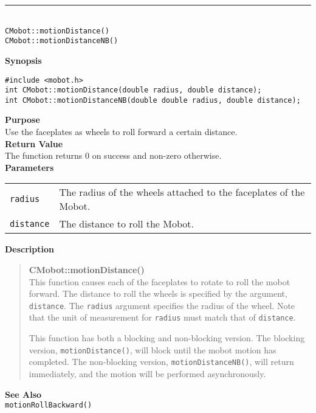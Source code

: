 \noindent
\vspace{5pt}
\rule{4.5in}{0.015in}\\
\noindent
{\LARGE \texttt{CMobot::motionDistance()}}\\
{\LARGE \texttt{CMobot::motionDistanceNB()}}\\
{}

\noindent
{\bf Synopsis}
\vspace{-8pt}
\begin{verbatim}
#include <mobot.h>
int CMobot::motionDistance(double radius, double distance);
int CMobot::motionDistanceNB(double double radius, double distance);
\end{verbatim}

\noindent
{\bf Purpose}\\
Use the faceplates as wheels to roll forward a certain distance.\\

\noindent
{\bf Return Value}\\
The function returns 0 on success and non-zero otherwise.\\

\noindent
{\bf Parameters}\\
\vspace{-0.1in}
\begin{description}
\item               
\begin{tabular}{p{15 mm}p{145 mm}}
\texttt{radius} & The radius of the wheels attached to the faceplates of the Mobot.\\
\texttt{distance} & The distance to roll the Mobot.\\
\end{tabular}
\end{description}

\noindent
{\bf Description}\\
\vspace{-12pt}
\begin{quote}
{\bf CMobot::motionDistance()}\\
This function causes each of the faceplates to rotate to roll the
mobot forward. The distance to roll the wheels is specified by the argument,
\texttt{distance}. The \texttt{radius} argument specifies the radius of the wheel.
Note that the unit of measurement for \texttt{radius} must match that of
\texttt{distance}. 

This function has both a blocking and non-blocking version.
The blocking version, \texttt{motionDistance()}, will block until the
mobot motion has completed. The non-blocking version, \texttt{motionDistanceNB()},
will return immediately, and the motion will be performed asynchronously.\\
\end{quote}

\noindent
{\bf See Also}\\
\texttt{motionRollBackward()}


